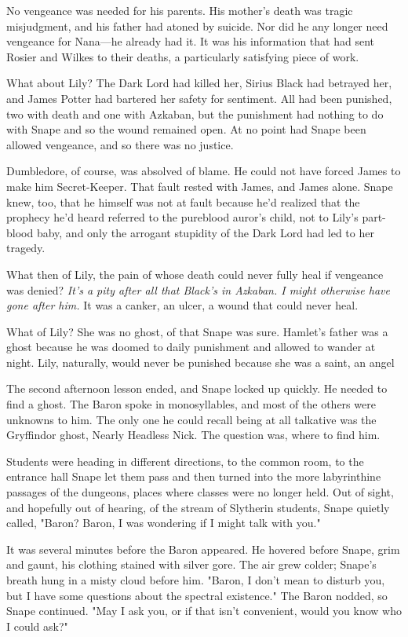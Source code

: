 No vengeance was needed for his parents. His mother's death was tragic misjudgment, and his father had atoned by suicide. Nor did he any longer need vengeance for Nana—he already had it. It was his information that had sent Rosier and Wilkes to their deaths, a particularly satisfying piece of work.

What about Lily? The Dark Lord had killed her, Sirius Black had betrayed her, and James Potter had bartered her safety for sentiment. All had been punished, two with death and one with Azkaban, but the punishment had nothing to do with Snape and so the wound remained open. At no point had Snape been allowed vengeance, and so there was no justice.

Dumbledore, of course, was absolved of blame. He could not have forced James to make him Secret-Keeper. That fault rested with James, and James alone. Snape knew, too, that he himself was not at fault because he'd realized that the prophecy he'd heard referred to the pureblood auror's child, not to Lily's part-blood baby, and only the arrogant stupidity of the Dark Lord had led to her tragedy.

What then of Lily, the pain of whose death could never fully heal if vengeance was denied? \emph{It's a pity after all that Black's in Azkaban. I might otherwise have gone after him.} It was a canker, an ulcer, a wound that could never heal.

What of Lily? She was no ghost, of that Snape was sure. Hamlet's father was a ghost because he was doomed to daily punishment and allowed to wander at night. Lily, naturally, would never be punished because she was a saint, an angel{\el}

The second afternoon lesson ended, and Snape locked up quickly. He needed to find a ghost. The Baron spoke in monosyllables, and most of the others were unknowns to him. The only one he could recall being at all talkative was the Gryffindor ghost, Nearly Headless Nick. The question was, where to find him.

Students were heading in different directions, to the common room, to the entrance hall{\el} Snape let them pass and then turned into the more labyrinthine passages of the dungeons, places where classes were no longer held. Out of sight, and hopefully out of hearing, of the stream of Slytherin students, Snape quietly called, "Baron? Baron, I was wondering if I might talk with you."

It was several minutes before the Baron appeared. He hovered before Snape, grim and gaunt, his clothing stained with silver gore. The air grew colder; Snape's breath hung in a misty cloud before him. "Baron, I don't mean to disturb you, but I have some questions about the spectral existence." The Baron nodded, so Snape continued. "May I ask you, or if that isn't convenient, would you know who I could ask?"

